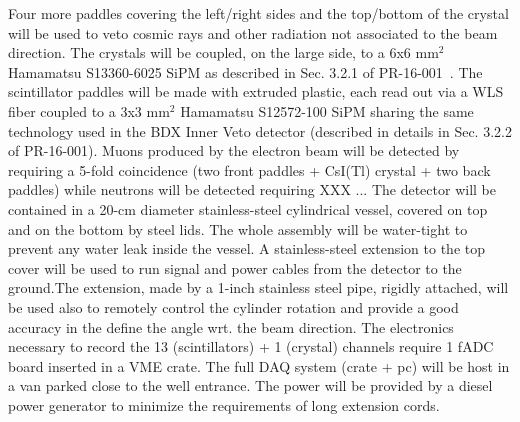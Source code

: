 Four more  paddles covering  the left/right sides and the top/bottom of the crystal will be used to veto cosmic rays and other radiation not associated to the beam direction.
The crystals will be coupled, on the large side,  to a 6x6 mm$^2$ Hamamatsu S13360-6025 SiPM as described in Sec. 3.2.1 of  PR-16-001~\cite{bdx-proposal}. The scintillator paddles will be  made with extruded plastic, each  read out via a WLS fiber coupled to a 3x3 mm$^2$ Hamamatsu S12572-100 SiPM sharing the same technology used in the BDX Inner Veto detector (described in details in Sec. 3.2.2 of  PR-16-001).
Muons produced by the electron beam will be detected by requiring a 5-fold coincidence (two front paddles + CsI(Tl) crystal + two back  paddles) while neutrons will be detected requiring XXX ...
The detector will be contained  in a 20-cm diameter stainless-steel cylindrical vessel, covered on top and on the bottom by steel lids. The whole assembly will  be water-tight to prevent any water leak inside the vessel. A stainless-steel  extension to the top cover will be used  to run signal and power cables from the detector to the ground.The extension, made by a 1-inch stainless steel pipe,  rigidly attached, will be used also  to remotely control the cylinder rotation and provide a good accuracy in the define the angle wrt. the beam direction.
The electronics necessary to record the 13 (scintillators) + 1 (crystal) channels require 1 fADC board inserted in a VME crate. The full DAQ system (crate + pc)  will be host in a van parked close to the well entrance. The power will be provided by a diesel power generator to minimize the requirements of long extension cords.

